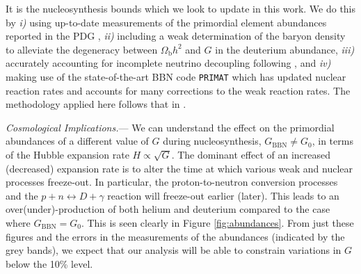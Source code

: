 \documentclass[notitlepage,twocolumn,letterpaper,natbib,aps,prl,amsmath,amsfonts,nofootinbib,preprintnumbers,superscriptaddress,secnumarabic,groupedaddress]{revtex4-1}
\begin{document}
It is the nucleosynthesis bounds which we look to update in this work. We do this by \emph{i)} using up-to-date measurements of the primordial element abundances reported in the PDG \cite{pdg}, \emph{ii)} including a weak determination of the baryon density \cite{Bai:2015vca} to alleviate the degeneracy between $\Omega_{\mathrm{b}}h^2$ and $G$ in the deuterium abundance, \emph{iii)} accurately accounting for incomplete neutrino decoupling following \cite{Escudero:2018mvt,Escudero:2019new}, and \emph{iv)} making use of the state-of-the-art BBN code \texttt{PRIMAT} \cite{Pitrou:2018cgg} which has updated nuclear reaction rates and accounts for many corrections to the weak reaction rates. The methodology applied here follows that in \cite{Sabti:2019mhn}. 
\setlength\parskip{10pt}


\emph{Cosmological Implications.}--- We can understand the effect on the primordial abundances of a different value of $G$ during nucleosynthesis, $G_{\mathrm{BBN}} \neq G_0$, in terms of the Hubble expansion rate $H \propto \sqrt{G}$. The dominant effect of an increased (decreased) expansion rate is to alter the time at which various weak and nuclear processes freeze-out. In particular, the proton-to-neutron conversion processes and the $p + n \leftrightarrow D + \gamma$ reaction will freeze-out earlier (later). This leads to an over(under)-production of both helium and deuterium compared to the case where $G_{\mathrm{BBN}} = G_0$. This is seen clearly in Figure \ref{fig:abundances}. From just these figures and the errors in the measurements of the abundances (indicated by the grey bands), we expect that our analysis will be able to constrain variations in $G$ below the 10\% level. 
\end{document}
